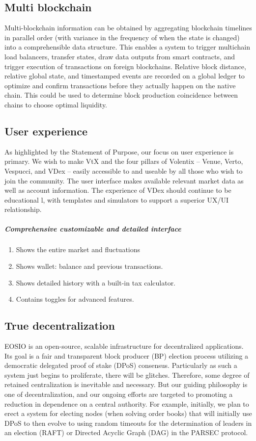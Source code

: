 \documentclass[]{article}
\begin{document}
{\subsection{Multi blockchain}
Multi-blockchain information can be obtained by aggregating blockchain timelines in parallel order 
(with variance in the frequency of when the state is changed) into a comprehensible data structure.
This enables a system to trigger multichain load balancers, transfer states, draw data outputs from smart contracts, 
and trigger execution of transactions on foreign blockchains. 
Relative block distance, relative global state, and timestamped events are recorded on a global ledger to optimize and confirm transactions 
before they actually happen on the native chain.
This could be used to determine block production coincidence between chains to choose optimal liquidity.\cite{20}

\subsection{User experience}
As highlighted by the Statement of Purpose, our focus on user experience is primary. We wish to make VtX and the four pillars of Volentix -- Venue, Verto, Vespucci, and VDex -- easily accessible to and useable by all those who wish to join the community. The user interface makes available relevant market data as well as account information. The experience of VDex should continue to be educational l, with templates and simulators to support a superior UX/UI relationship. 
\subparagraph{Comprehensive customizable and detailed interface}
\begin{enumerate}
	\item Shows the entire market and fluctuations
	\item Shows wallet: balance and previous transactions.
	\item Shows detailed history with a built-in tax calculator.
	\item Contains toggles for advanced features.         
\end{enumerate}

\subsection{True decentralization}

EOSIO is an open-source, scalable infrastructure for decentralized applications. Its goal is a fair and transparent block producer (BP) election process utilizing a democratic delegated proof of stake (DPoS) consensus. Particularly as such a system just begins to proliferate, there will be glitches.  Therefore, some degree of retained centralization is inevitable and necessary. But our guiding philosophy is one of decentralization, and our ongoing efforts are targeted to promoting a reduction in dependence on a central authority. 
For example, initially, we plan to erect a system for electing nodes (when solving order books) that will initially use DPoS to then evolve to using random timeouts for the determination of leaders in an election (RAFT) or Directed Acyclic Graph (DAG) in the PARSEC protocol.


}
\end{document}
